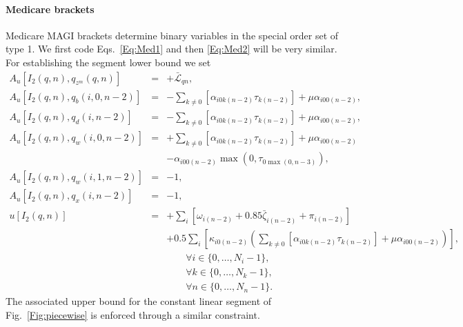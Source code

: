 \documentclass{report}[fleqn,11pt]
\begin{document}
\paragraph*{Medicare brackets}
Medicare MAGI brackets determine binary variables in the special order set of type 1.
We first code Eqs.~\ref{Eq:Med1} and then \ref{Eq:Med2} will be very similar.
For establishing the segment lower bound we set
\begin{eqnarray}
	A_u[I_2(q, n), q_{z^m}(q, n)] &=& +\bar{\mathcal{L}}_{qn}, \nonumber \\
	A_u[I_2(q, n), q_{b}(i, 0, n-2)] &=&
	    - \sum_{k\neq 0} [\alpha_{i0k(n-2)}\tau_{k(n-2)}] + \mu \alpha_{i00(n-2)}, \nonumber \\
	A_u[I_2(q, n), q_{d}(i, n-2)] &=&
	    - \sum_{k\neq 0} [\alpha_{i0k(n-2)}\tau_{k(n-2)}] + \mu \alpha_{i00(n-2)}, \nonumber \\
	A_u[I_2(q, n), q_{w}(i, 0, n-2)] &=& + \sum_{k\neq 0} [\alpha_{i0k(n-2)}\tau_{k(n-2)}] + \mu \alpha_{i00(n-2)} \nonumber \\
	 && -\alpha_{i00(n-2)}\max(0, \tau_{0\max(0, n-3)}), \nonumber \\
	A_u[I_2(q, n), q_{w}(i, 1, n-2)] &=& -1, \nonumber \\
	A_u[I_2(q, n), q_{x}(i, n-2)] &=& -1, \nonumber \\
	u[I_2(q, n)] &=& +\sum_i \left[\omega_{i(n-2)} + 0.85\bar{\zeta}_{i(n-2)} + \pi_{i(n-2)} \right]\nonumber \\
	&& + 0.5 \sum_i \left[\kappa_{i0(n-2)}  \left(
	  \sum_{k\neq 0} [\alpha_{i0k(n-2)}\tau_{k(n-2)}] + \mu\alpha_{i00(n-2)}\right)\right],\nonumber\\
	&&\qquad\forall i \in \{0,\ldots, N_i - 1\}, \nonumber\\
	&&\qquad\forall k \in \{0,\ldots, N_k - 1\}, \nonumber\\
	&&\qquad\forall n \in \{0,\ldots, N_n - 1\}.
\end{eqnarray}
The associated upper bound for the constant linear segment of Fig.~\ref{Fig:piecewise} is enforced through
a similar constraint.
\end{document}
